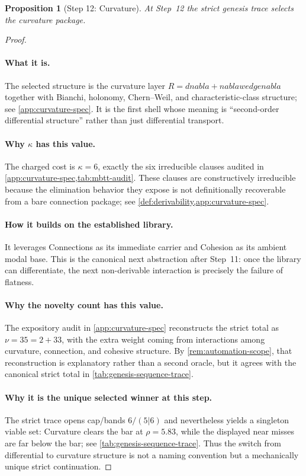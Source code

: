 \documentclass[11pt,a4paper]{article}
\def\nabla{nabla}%
\def\wedge{wedge}%
\theoremstyle{plain}
\newtheorem{proposition}[theorem]{Proposition}
\theoremstyle{definition}
\theoremstyle{remark}
\begin{document}
\begin{proposition}[Step 12: Curvature]
\label{prop:genesis-step12}
At Step~12 the strict genesis trace selects the curvature package.
\end{proposition}

\begin{proof}
\paragraph{What it is.}
The selected structure is the curvature layer
$R=d\nabla+\nabla\wedge\nabla$ together with Bianchi, holonomy, Chern--Weil, and
characteristic-class structure; see \cref{app:curvature-spec}.
It is the first shell whose meaning is ``second-order differential structure''
rather than just differential transport.

\paragraph{Why $\kappa$ has this value.}
The charged cost is $\kappa=6$, exactly the six irreducible clauses audited in
\cref{app:curvature-spec,tab:mbtt-audit}.
These clauses are constructively irreducible because the elimination behavior
they expose is not definitionally recoverable from a bare connection package;
see \cref{def:derivability,app:curvature-spec}.

\paragraph{How it builds on the established library.}
It leverages Connections as its immediate carrier and Cohesion as its ambient
modal base.
This is the canonical next abstraction after Step~11: once the library can
differentiate, the next non-derivable interaction is precisely the failure of
flatness.

\paragraph{Why the novelty count has this value.}
The expository audit in \cref{app:curvature-spec} reconstructs the strict total
as $\nu=35=2+33$, with the extra weight coming from interactions among
curvature, connection, and cohesive structure.
By \cref{rem:automation-scope}, that reconstruction is explanatory rather than a
second oracle, but it agrees with the canonical strict total in
\cref{tab:genesis-sequence-trace}.

\paragraph{Why it is the unique selected winner at this step.}
The strict trace opens cap/bands $6/(5|6)$ and nevertheless yields a singleton
viable set: Curvature clears the bar at $\rho=5.83$, while the displayed near
misses are far below the bar; see \cref{tab:genesis-sequence-trace}.
Thus the switch from differential to curvature structure is not a naming
convention but a mechanically unique strict continuation.
\end{proof}
\end{document}

